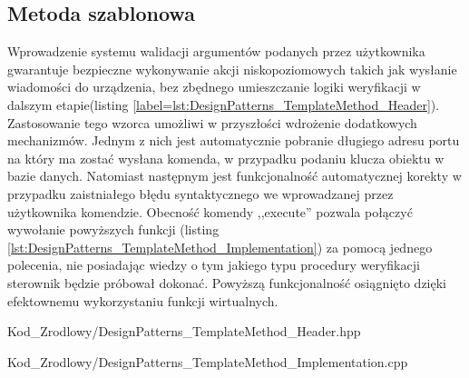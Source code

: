     \subsection{Metoda szablonowa}
        Wprowadzenie systemu walidacji argumentów podanych przez użytkownika gwarantuje bezpieczne wykonywanie akcji niskopoziomowych takich
        jak wysłanie wiadomości do urządzenia, bez zbędnego umieszczanie logiki weryfikacji w dalszym etapie(listing \ref{label=lst:DesignPatterns_TemplateMethod_Header}). Zastosowanie tego wzorca umożliwi w przyszłości wdrożenie dodatkowych mechanizmów.
        Jednym z nich jest automatycznie pobranie długiego adresu portu na który ma zostać wysłana komenda, w przypadku podaniu klucza obiektu w bazie danych. 
        Natomiast następnym jest funkcjonalność automatycznej korekty w przypadku zaistniałego błędu syntaktycznego we wprowadzanej przez użytkownika komendzie.
        Obecność komendy ,,execute'' pozwala połączyć wywołanie powyższych funkcji (listing \ref{lst:DesignPatterns_TemplateMethod_Implementation}) za pomocą jednego polecenia\cite{gamma2005wzorce},
        nie posiadając wiedzy o tym jakiego typu procedury weryfikacji sterownik będzie próbował dokonać. Powyższą funkcjonalność osiągnięto dzięki efektownemu wykorzystaniu
        funkcji wirtualnych.
        
            {Kod_Zrodlowy/DesignPatterns_TemplateMethod_Header.hpp}
        
            {Kod_Zrodlowy/DesignPatterns_TemplateMethod_Implementation.cpp}
